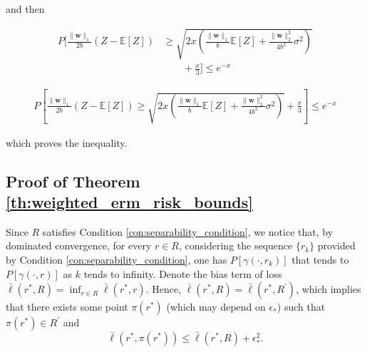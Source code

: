 \documentclass[letterpaper]{article} %
\def\DoubleColumn{}
\def\DoubleColumnEnd{}
\def\SingleColumn{}
\def\SingleColumnEnd{}
\newtheorem{lemma}{Lemma}
\newcommand{\E}{\mathbb{E}}
\newcommand{\Pro}{P}
\newcommand{\weight}{\mathbf{w}}
\newcommand{\relossf}{\bar{\ell}}
\newcommand{\normo}[1]{\|#1\|_1}
\newcommand{\citep}[3]{(#1\ \citeauthor{#3}\ \citeyear{#3},\ #2)}
\begin{document}
    and then
    \DoubleColumn
    \begin{align*}
        \Pro[\frac{\normo{\weight{}}}{2b}(Z-\E[Z])&\ge \sqrt{2x(\frac{\normo{\weight{}}}{b}\E[Z]+\frac{\|\weight{}\|_2^2}{4b^2}\sigma^2)}\\
        &\qquad+\frac{x}{3}] \le e^{-x}
    \end{align*}
    \DoubleColumnEnd
    \SingleColumn
    \begin{align*}
        \Pro\left[\frac{\normo{\weight{}}}{2b}(Z-\E[Z])\ge \sqrt{2x(\frac{\normo{\weight{}}}{b}\E[Z]+\frac{\|\weight{}\|_2^2}{4b^2}\sigma^2)}+\frac{x}{3}\right] \le e^{-x}
    \end{align*}
    \SingleColumnEnd
    which proves the inequality.

\subsection{Proof of Theorem \ref{th:weighted_erm_risk_bounds}} %
\label{sub:proof_of_theorem_th:weighted_erm_risk_bounds}

    Since $R$ satisfies Condition \ref{con:separability_condition}, we notice that, by dominated convergence, for every $r\in R$, considering the sequence $\{r_k\}$ provided by Condition \ref{con:separability_condition}, one has $\Pro[\gamma(\cdot,r_k)]$ that tends to $\Pro[\gamma(\cdot, r)]$ as $k$ tends to infinity. Denote the bias term of loss $\relossf(r^*,R)=\inf_{r\in R}\relossf(r^*,r)$. Hence, $\relossf(r^*,R)=\relossf(r^*,R^\prime)$, which implies that there exists some point $\pi(r^*)$ (which may depend on $\epsilon_*$) such that $\pi(r^*)\in R^\prime$ and
    \begin{equation}
        \label{eq:asymptotic_function_inequality}
        \relossf(r^*, \pi(r^*))\le \relossf(r^*,R)+\epsilon_*^2.
    \end{equation}
\end{document}
